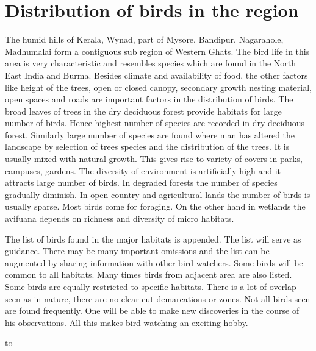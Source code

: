 \chapter{Distribution of birds in the region}

The humid hills of Kerala, Wynad, part of Mysore, Bandipur, 
Nagarahole, Madhumalai form a contiguous sub region of Western 
Ghats. The bird life in this area is very characteristic and 
resembles species which are found in the North East India and Burma. 
Besides climate and availability of food, the other factors like 
height of the trees, open or closed canopy, secondary growth 
nesting material, open spaces and roads are important factors in 
the distribution of birds. The broad leaves of trees in the dry 
deciduous forest provide habitats for large number of birds. 
Hence highest number of species are recorded in dry deciduous 
forest. Similarly large number of species are found where man has 
altered the landscape by selection of trees species and the 
distribution of the trees. It is usually mixed with natural 
growth. This gives rise to variety of covers in parks, campuses, 
gardens. The diversity of environment is artificially high and it 
attracts large number of birds. In degraded forests the number of 
species gradually diminish. In open country and agricultural 
lands the number of birds is usually sparse. Most birds come for 
foraging. On the other hand in wetlands the avifuana depends on 
richness and diversity of micro habitats. 

The list of birds found in the major habitats is appended. 
The list will serve as guidance. There may be many important 
omissions and the list can be augmented by sharing information 
with other bird watchers. Some birds will be common to all 
habitats. Many times birds from adjacent area are also listed. Some birds 
are equally restricted to specific habitats. There is a lot of 
overlap seen as in nature, there are no clear cut demarcations or 
zones. Not all birds seen are found frequently. One will be able 
to make new discoveries in the course of his observations. All 
this makes bird watching an exciting hobby. 
\bigskip

\vbox{\vfill\hbox to\vfill}


\setcounter{chapter}{4}

